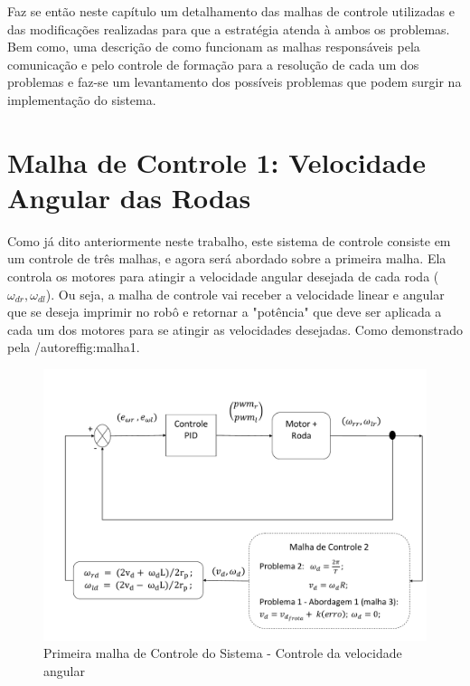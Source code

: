 Faz se então neste capítulo um detalhamento das malhas de controle utilizadas e das modificações realizadas para que a estratégia atenda à ambos os problemas. Bem como, uma descrição de como funcionam as malhas responsáveis pela comunicação e pelo controle de formação para a resolução de cada um dos problemas e faz-se um levantamento dos possíveis problemas que podem surgir na implementação do sistema.   

\section{Malha de Controle 1: Velocidade Angular das Rodas}
\label{sec:malha1 } 
Como já dito anteriormente neste trabalho, este sistema de controle consiste em um controle de três malhas, e agora será abordado sobre a primeira malha. Ela controla os motores para atingir a velocidade angular desejada de cada roda ($\omega_{dr},\omega_{dl}$). Ou seja, a malha de controle vai receber a velocidade linear e angular que se deseja imprimir no robô e retornar a "potência" que deve ser aplicada a cada um dos motores para se atingir as velocidades desejadas. Como demonstrado pela /autoref{fig:malha1}.

\begin{figure}[!htb]
	\centering
	\includegraphics[width=1.0\textwidth]{./04-figuras/malha1}
	\caption{Primeira malha de Controle do Sistema - Controle da velocidade angular}
	\label{fig:malha1}
\end{figure}

